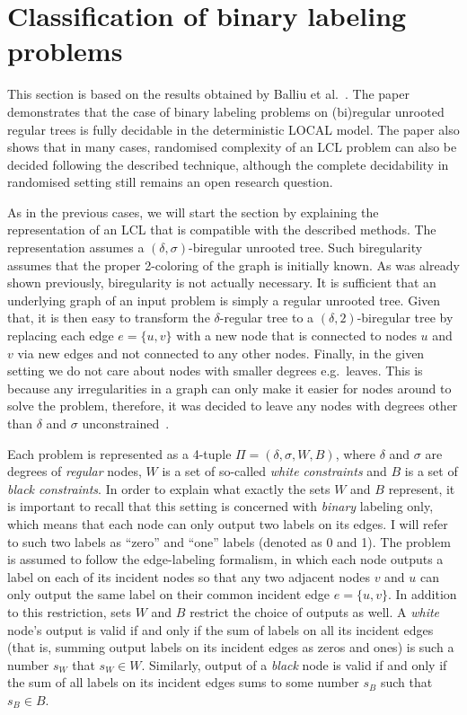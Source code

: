 \section{Classification of binary labeling problems}

This section is based on the results obtained by Balliu et al.~\cite{Balliu2019c}. The paper demonstrates
that the case of binary labeling problems on (bi)regular unrooted regular trees is fully decidable in
the deterministic LOCAL model. The paper also shows that in many cases, randomised complexity of an LCL problem
can also be decided following the described technique, although the complete decidability in randomised setting
still remains an open research question.

As in the previous cases, we will start the section by explaining the representation of an LCL that is compatible
with the described methods. The representation assumes a $(\delta, \sigma)$-biregular unrooted tree.
Such biregularity assumes that the proper 2-coloring of the graph is initially known.
As was already shown previously, biregularity is not actually necessary. It is
sufficient that an underlying graph of an input problem is simply a regular
unrooted tree. Given that, it is then easy to transform the $\delta$-regular tree
to a $(\delta, 2)$-biregular tree by replacing each edge $e = \{u, v\}$ with a new node that is
connected to nodes $u$ and $v$ via new edges and not connected to any other nodes. Finally,
in the given setting we do not care about nodes with smaller degrees e.g.\ leaves. This is
because any irregularities in a graph can only make it easier for nodes around to solve
the problem, therefore, it was decided to leave any nodes with degrees other than $\delta$
and $\sigma$ unconstrained~\cite{Balliu2019c}.

Each problem is represented as a 4-tuple $\Pi = (\delta, \sigma, W, B)$, where
$\delta$ and $\sigma$ are degrees of \emph{regular} nodes, $W$ is a set of so-called
\emph{white constraints} and $B$ is a set of \emph{black constraints}. In order to
explain what exactly the sets $W$ and $B$ represent, it is important to recall that
this setting is concerned with \emph{binary} labeling only, which means that each node
can only output two labels on its edges. I will refer to such two labels as ``zero'' and ``one''
labels (denoted as 0 and 1). The problem is assumed to follow the edge-labeling
formalism, in which each node outputs a label on each of its incident nodes so that
any two adjacent nodes $v$ and $u$ can only output the same label on their common
incident edge $e = \{u, v\}$. In addition to this restriction, sets $W$ and $B$
restrict the choice of outputs as well. A \emph{white} node's output is valid
if and only if the sum of labels on all its incident edges (that is, summing
output labels on its incident edges as zeros and ones) is such a number $s_W$ that
$s_W \in W$. Similarly, output of a \emph{black} node is valid if and only if
the sum of all labels on its incident edges sums to some number $s_B$ such that
$s_B \in B$.

